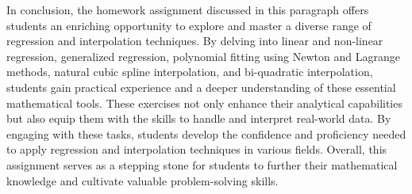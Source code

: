 \documentclass[12pt, a4paper]{article}
\numberwithin{equation}{section}
\begin{document}
In conclusion, the homework assignment discussed in this paragraph offers students an enriching opportunity to explore and master a diverse range of regression and interpolation techniques. By delving into linear and non-linear regression, generalized regression, polynomial fitting using Newton and Lagrange methods, natural cubic spline interpolation, and bi-quadratic interpolation, students gain practical experience and a deeper understanding of these essential mathematical tools. These exercises not only enhance their analytical capabilities but also equip them with the skills to handle and interpret real-world data. By engaging with these tasks, students develop the confidence and proficiency needed to apply regression and interpolation techniques in various fields. Overall, this assignment serves as a stepping stone for students to further their mathematical knowledge and cultivate valuable problem-solving skills.
\end{document}
